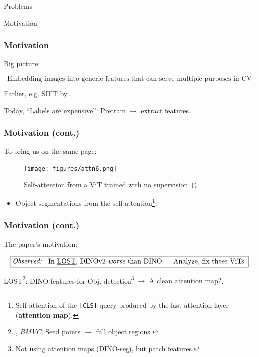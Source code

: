 \documentclass[aspectratio=169]{beamer}
\begin{document}
\begin{section}{Problems}

\begin{subsection}{Motivation}

\begin{frame}
\frametitle{Motivation}
\vspace{4.2em}
Big picture:

$$
\boxed{\text{Embedding images into generic features that can serve multiple purposes in CV}}
$$

\vspace{6.48em}
Earlier, e.g. SIFT by \cite{loweDistinctiveImageFeatures2004}.

Today, ``Labels are expensive'': Pretrain $\rightarrow$ extract features.
\end{frame}

\begin{frame}
\frametitle{Motivation (cont.)}
To bring us on the same page:

\begin{figure}[h]
    \centering
    \texttt{[image: figures/attn6.png]}
    \caption{Self-attention from a ViT trained with no supervision~(\cite{caronEmergingPropertiesSelfsupervised2021}).}
    \label{fig:attn6}
\end{figure}
\vspace{-1em}
\begin{itemize}
    \item Object segmentations from the self-attention\footnote{Self-attention of the \texttt{[CLS]} query produced by the last attention layer (\textbf{attention map}).}.
\end{itemize}

\end{frame}

\begin{frame}
\frametitle{Motivation (cont.)}
\vspace{4.2em}
The paper's motivation:

$$
\boxed{\text{\emph{Observed: } In \underline{LOST}, DINOv2 \emph{worse} than DINO. } \quad \text{Analyze, fix these ViTs.}}
$$

\vspace{4.2em}
\underline{LOST\footnote{\cite{simeoniLocalizingObjectsSelfsupervised2021}, \textit{BMVC}; Seed points $\rightarrow$ full object regions.}}:
DINO features for Obj. detection\footnote{Not using attention maps (DINO-seg), but patch features.}.\quad $\rightarrow$ \quad $\boxed{\text{A clean attention map?}}$.
\end{frame}


\end{subsection}
\end{section}
\end{document}
